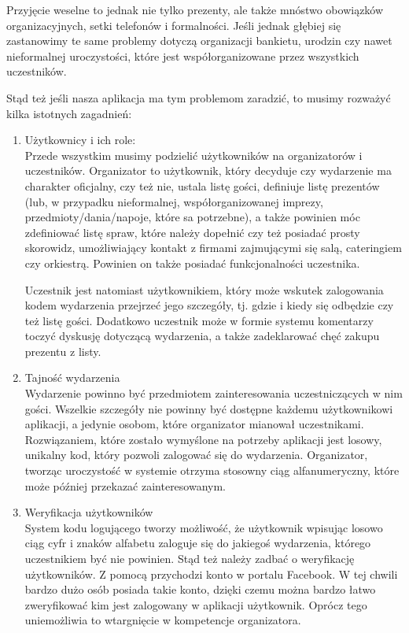 \documentclass[10pt,titlepage]{article}
\begin{document}
Przyjęcie weselne to jednak nie tylko prezenty, ale także mnóstwo obowiązków organizacyjnych, setki telefonów i formalności. Jeśli jednak głębiej się zastanowimy
te same problemy dotyczą organizacji bankietu, urodzin czy nawet nieformalnej uroczystości, które jest współorganizowane przez wszystkich uczestników.

Stąd też jeśli nasza aplikacja ma tym problemom zaradzić, to musimy rozważyć kilka istotnych zagadnień:

\begin{enumerate}
 \item Użytkownicy i ich role:
 \\ Przede wszystkim musimy podzielić użytkowników na organizatorów i uczestników.
 Organizator to użytkownik, który decyduje czy wydarzenie ma charakter oficjalny, czy też nie, ustala listę gości, definiuje listę prezentów (lub, w przypadku
 nieformalnej, współorganizowanej imprezy, przedmioty/dania/napoje, które sa potrzebne), a także powinien móc zdefiniować listę spraw, które należy dopełnić czy też
 posiadać prosty skorowidz, umożliwiający kontakt z firmami zajmującymi się salą, cateringiem czy orkiestrą. Powinien on także posiadać funkcjonalności uczestnika.
 
 Uczestnik jest natomiast użytkownikiem, który może wskutek zalogowania kodem wydarzenia przejrzeć jego szczegóły, tj. gdzie i kiedy się odbędzie czy też listę gości.
 Dodatkowo uczestnik może w formie systemu komentarzy toczyć dyskusję dotyczącą wydarzenia, a także zadeklarować chęć zakupu prezentu z listy.
 
 \item Tajność wydarzenia
 \\ Wydarzenie powinno być przedmiotem zainteresowania uczestniczących w nim gości. Wszelkie szczegóły nie powinny być dostępne każdemu użytkownikowi aplikacji, a jedynie
 osobom, które organizator mianował uczestnikami. Rozwiązaniem, które zostało wymyślone na potrzeby aplikacji jest losowy, unikalny kod, który pozwoli zalogować się do
 wydarzenia. Organizator, tworząc uroczystość w systemie otrzyma stosowny ciąg alfanumeryczny, które może później przekazać zainteresowanym.
 
 
 \item Weryfikacja użytkowników
 \\ System kodu logującego tworzy możliwość, że użytkownik wpisując losowo ciąg cyfr i znaków alfabetu zaloguje się do jakiegoś wydarzenia, którego uczestnikiem być nie powinien.
 Stąd też należy zadbać o weryfikację użytkowników. Z pomocą przychodzi konto w portalu Facebook. W tej chwili bardzo dużo osób posiada takie konto, dzięki czemu można bardzo łatwo
 zweryfikować kim jest zalogowany w aplikacji użytkownik.
 Oprócz tego uniemożliwia to wtargnięcie w kompetencje organizatora.
 

\end{enumerate}
\end{document}
